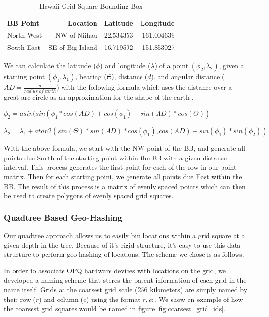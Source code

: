 \begin{table}[htbp]
	\caption{Hawaii Grid Square Bounding Box}
	\label{tab:bb_hawaii}
	\begin{center}
		\begin{tabular}{|l|r|r|r|}
			\hline
			\textbf{BB Point} & \textbf{ Location} & \textbf{Latitude} & \textbf{Longitude}\\
			\hline
			North West & NW of Niihau & 22.534353 & -161.004639\\
			\hline
			South East & SE of Big Island & 16.719592 & -151.853027\\
			\hline
		\end{tabular} 
	\end{center}
\end{table}

We can calculate the latitude ($\phi$) and longitude ($\lambda$) of a point $(\phi_2, \lambda_2)$, given a starting point $(
\phi_1, \lambda_1)$, bearing ($\Theta$), distance ($d$), and angular distance ($AD=\frac{d}{radius\ of\ earth}$) with the following formula which uses the distance over a great arc circle as an approximation for the shape of the earth \cite{w:calc_lat_lng}.

$\phi_2 = asin(sin(\phi_1 * cos(AD) + cos(\phi_1) + sin(AD) * cos(\Theta))$

$\lambda_2 = \lambda_1 + atan2(sin(\Theta) * sin(AD) * cos(\phi_1), cos(AD) - sin(\phi_1) * sin(\phi_2))$

With the above formula, we start with the NW point of the BB, and generate all points due South of the starting point within the BB with a given distance interval. This process generates the first point for each of the row in our point matrix. Then for each starting point, we generate all points due East within the BB. The result of this process is a matrix of evenly spaced points which can then be used to create polygons of evenly spaced grid squares.

\subsubsection{Quadtree Based Geo-Hashing}
Our quadtree approach allows us to easily bin locations within a grid square at a given depth in the tree. Because of it's rigid structure, it's easy to use this data structure to perform geo-hashing of locations. The scheme we chose is as follows.

In order to associate OPQ hardware devices with locations on the grid, we developed a naming scheme that stores the parent information of each grid in the name itself. Grids at the coarsest grid scale (256 kilometers) are simply named by their row ($r$) and column ($c$) using the format $r,c:$. We show an example of how the coarsest grid squares would be named in figure \ref{fig:coarsest_grid_ids}.

